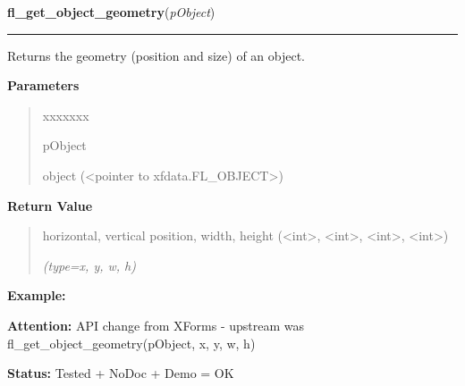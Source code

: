 \hspace{.8\funcindent}\begin{boxedminipage}{\funcwidth}

    \raggedright \textbf{fl\_get\_object\_geometry}(\textit{pObject})

    \vspace{-1.5ex}

    \rule{\textwidth}{0.5\fboxrule}
\setlength{\parskip}{2ex}
    Returns the geometry (position and size) of an object.

\setlength{\parskip}{1ex}
      \textbf{Parameters}
      \vspace{-1ex}

      \begin{quote}
        \begin{Ventry}{xxxxxxx}

          \item[pObject]

          object ({\textless}pointer to xfdata.FL\_OBJECT{\textgreater})

        \end{Ventry}

      \end{quote}

      \textbf{Return Value}
    \vspace{-1ex}

      \begin{quote}
      horizontal, vertical position, width, height 
      ({\textless}int{\textgreater}, {\textless}int{\textgreater}, 
      {\textless}int{\textgreater}, {\textless}int{\textgreater})

      {\it (type=x, y, w, h)}

      \end{quote}

\textbf{Example:} 

\textbf{Attention:} API change from XForms - upstream was fl\_get\_object\_geometry(pObject, x,
y, w, h)



\textbf{Status:} Tested + NoDoc + Demo = OK



    \end{boxedminipage}

    \label{xformslib:library:fl_get_object_position}

    \vspace{0.5ex}

